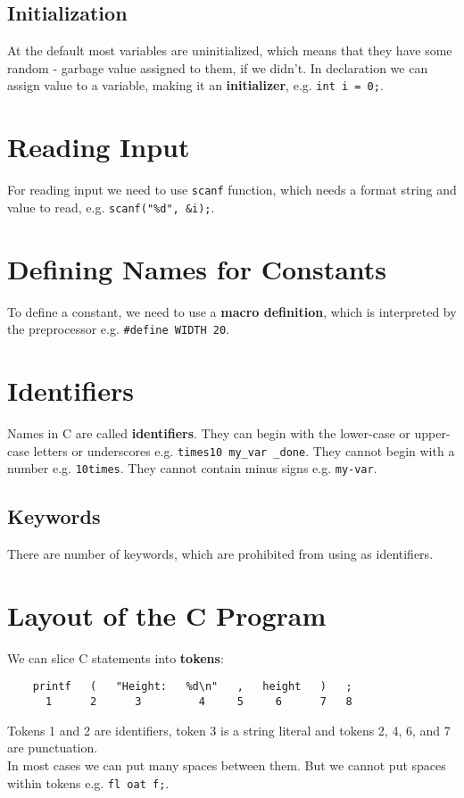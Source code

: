 \documentclass[12pt, openany]{book}
\begin{document}
    \subsection*{Initialization}
    At the default most variables are uninitialized, which means that they have some
    random - garbage value assigned to them, if we didn't. In declaration we can assign
    value to a variable, making it an \textbf{initializer}, e.g. \texttt{int i = 0;}.

    \section{Reading Input}
    For reading input we need to use \texttt{scanf} function, which needs a format
    string and value to read, e.g. \texttt{scanf("\%d", \&i);}.

    \section{Defining Names for Constants}
    To define a constant, we need to use a \textbf{macro definition}, which is
    interpreted by the preprocessor e.g. \texttt{\#define WIDTH 20}.

    \section{Identifiers}
    Names in C are called \textbf{identifiers}. They can begin with the lower-case or
    upper-case letters or underscores e.g. \texttt{times10  my\_var  \_done}. They
    cannot begin with a number e.g. \texttt{10times}. They cannot contain minus signs
    e.g. \texttt{my-var}.

    \subsection*{Keywords}
    There are number of keywords, which are prohibited from using as identifiers.

    \section{Layout of the C Program}
    We can slice C statements into \textbf{tokens}:
    \begin{lstlisting}
    printf   (   "Height:   %d\n"   ,   height   )   ;
      1      2      3         4     5     6      7   8
    \end{lstlisting}
    Tokens 1 and 2 are identifiers, token 3 is a string literal and tokens 2, 4, 6,
     and 7 are punctuation. \\
    In most cases we can put many spaces between them. But we cannot put spaces within
    tokens e.g. \texttt{fl oat f;}. 
\end{document}
